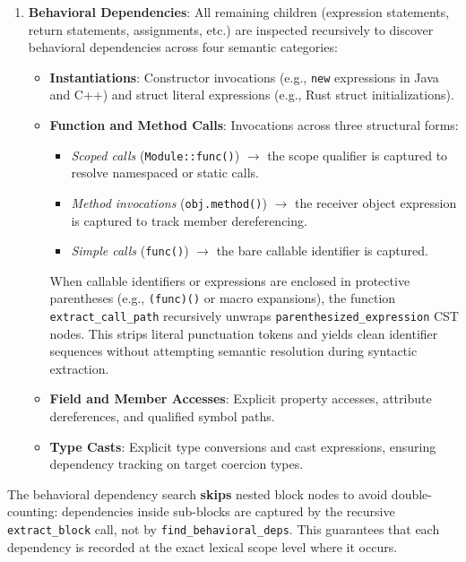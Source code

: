 \begin{enumerate}
  \item \textbf{Behavioral Dependencies}: All remaining children
    (expression statements, return statements, assignments, etc.) are
    inspected recursively to discover behavioral dependencies across four
    semantic categories:
    \begin{itemize}
      \item \textbf{Instantiations}: Constructor invocations (e.g., \texttt{new}
        expressions in Java and C++) and struct literal expressions
        (e.g., Rust struct initializations).
      \item \textbf{Function and Method Calls}: Invocations across
        three structural forms:
        \begin{itemize}
          \item \textit{Scoped calls} (\texttt{Module::func()}) $\to$
            the scope qualifier is captured to resolve namespaced or
            static calls.
          \item \textit{Method invocations} (\texttt{obj.method()})
            $\to$ the receiver object expression is captured to track
            member dereferencing.
          \item \textit{Simple calls} (\texttt{func()}) $\to$ the
            bare callable identifier is captured.
        \end{itemize}
        When callable identifiers or expressions are enclosed in protective
        parentheses (e.g., \texttt{(func)()} or macro expansions), the
        function \texttt{extr}\-\texttt{act\_call\_path} recursively unwraps
        \texttt{parenthesized\_expression} \linebreak CST nodes. This
        strips literal
        punctuation tokens and yields clean identifier sequences without
        attempting semantic resolution during syntactic extraction.
      \item \textbf{Field and Member Accesses}: Explicit property
        accesses, attribute dereferences, and qualified symbol paths.
      \item \textbf{Type Casts}: Explicit type conversions and cast
        expressions, ensuring dependency tracking on target coercion types.
    \end{itemize}
\end{enumerate}

The behavioral dependency search \textbf{skips} nested block nodes to
avoid double-counting: dependencies inside sub-blocks are captured by
the recursive \texttt{extr}\-\texttt{act\_block} call, not by
\texttt{find\_behavioral\_deps}. This guarantees that each dependency
is recorded at the exact lexical scope level where it occurs.

